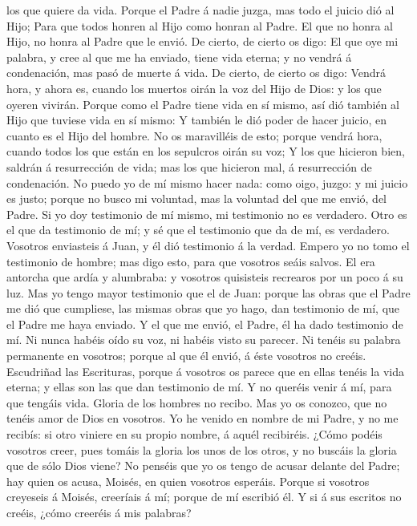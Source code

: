 los que quiere da vida.  Porque el Padre á nadie juzga,
mas todo el juicio dió al Hijo;  Para que todos honren al
Hijo como honran al Padre. El que no honra al Hijo, no honra al Padre
que le envió.  De cierto, de cierto os digo: El que oye
mi palabra, y cree al que me ha enviado, tiene vida eterna; y no vendrá
á condenación, mas pasó de muerte á vida.  De cierto, de
cierto os digo: Vendrá hora, y ahora es, cuando los muertos oirán la voz
del Hijo de Dios: y los que oyeren vivirán.  Porque como
el Padre tiene vida en sí mismo, así dió también al Hijo que tuviese
vida en sí mismo:  Y también le dió poder de hacer
juicio, en cuanto es el Hijo del hombre.  No os
maravilléis de esto; porque vendrá hora, cuando todos los que están en
los sepulcros oirán su voz;  Y los que hicieron bien,
saldrán á resurrección de vida; mas los que hicieron mal, á resurrección
de condenación.  No puedo yo de mí mismo hacer nada: como
oigo, juzgo: y mi juicio es justo; porque no busco mi voluntad, mas la
voluntad del que me envió, del Padre.  Si yo doy
testimonio de mí mismo, mi testimonio no es verdadero. 
Otro es el que da testimonio de mí; y sé que el testimonio que da de mí,
es verdadero.  Vosotros enviasteis á Juan, y él dió
testimonio á la verdad.  Empero yo no tomo el testimonio
de hombre; mas digo esto, para que vosotros seáis salvos.
 El era antorcha que ardía y alumbraba: y vosotros
quisisteis recrearos por un poco á su luz.  Mas yo tengo
mayor testimonio que el de Juan: porque las obras que el Padre me dió
que cumpliese, las mismas obras que yo hago, dan testimonio de mí, que
el Padre me haya enviado.  Y el que me envió, el Padre,
él ha dado testimonio de mí. Ni nunca habéis oído su voz, ni habéis
visto su parecer.  Ni tenéis su palabra permanente en
vosotros; porque al que él envió, á éste vosotros no creéis.
 Escudriñad las Escrituras, porque á vosotros os parece
que en ellas tenéis la vida eterna; y ellas son las que dan testimonio
de mí.  Y no queréis venir á mí, para que tengáis vida.
 Gloria de los hombres no recibo.  Mas yo
os conozco, que no tenéis amor de Dios en vosotros.  Yo
he venido en nombre de mi Padre, y no me recibís: si otro viniere en su
propio nombre, á aquél recibiréis.  ¿Cómo podéis vosotros
creer, pues tomáis la gloria los unos de los otros, y no buscáis la
gloria que de sólo Dios viene?  No penséis que yo os
tengo de acusar delante del Padre; hay quien os acusa, Moisés, en quien
vosotros esperáis.  Porque si vosotros creyeseis á
Moisés, creeríais á mí; porque de mí escribió él.  Y si á
sus escritos no creéis, ¿cómo creeréis á mis palabras?

